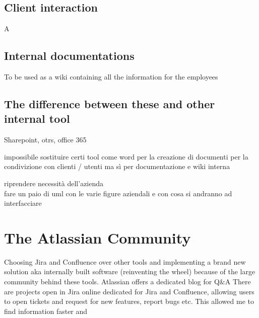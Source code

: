 	\subsection{Client interaction} 
		A
		
	\subsection{Internal documentations}
		To be used as a wiki containing all the information for the employees
		
	\subsection{The difference between these and other internal tool}
		Sharepoint, otrs, office 365
		
		impossibile sostituire certi tool come word per la creazione di documenti per la condivizione con clienti / utenti ma sì per documentazione e wiki interna


riprendere necessità dell'azienda\\
fare un paio di uml con le varie figure aziendali e con cosa si andranno ad interfacciare

\section{The Atlassian Community}
	Choosing Jira and Confluence over other tools and implementing a brand new solution aka internally built software (reinventing the wheel) 
	because of the large community behind these tools.
	Atlassian offers a dedicated blog for Q\&A
	There are projects open in Jira online dedicated for Jira and Confluence, allowing users to open tickets and request for new features, report bugs etc.
	This allowed me to find information faster and 

